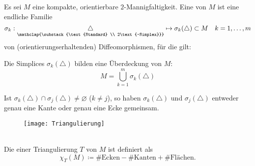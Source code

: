 \begin{definition}
  Es sei \( M \) eine kompakte, orientierbare \( 2 \)-Mannigfaltigkeit. Eine \label{def:triangulierung} von \( M \) ist eine endliche Familie
  \begin{equation*}
    \sigma_k : \underset{\mathclap{\substack{\text{Standard} \\ 2\text{-Simplex}}}}{\triangle} \mapsto \sigma_k(\triangle) \subset M \quad k = 1,\dots,m
  \end{equation*}
  von (orientierungserhaltenden) Diffeomorphismen, für die gilt:
  \begin{enumerate}
    \item Die Simplices \( \sigma_k(\triangle) \) bilden eine Überdeckung von \( M \):
    \begin{equation*}
      M = \bigcup_{k = 1}^m \sigma_k(\triangle)
    \end{equation*}

    \begin{minipage}{.45\textwidth}
      \item Ist \( \sigma_k(\triangle) \cap \sigma_j(\triangle) \neq \varnothing \) (\( k \neq j \)), so haben \( \sigma_k(\triangle) \) und \( \sigma_j(\triangle) \) entweder genau eine Kante oder genau eine Ecke gemeinsam.
    \end{minipage}
    \hfill
    \begin{minipage}{.525\textwidth}
      \begin{figure}[H]
        \texttt{[image: Triangulierung]}
      \end{figure}
    \end{minipage}
  \end{enumerate}
  \  \\

  Die  einer Triangulierung \( T \) von \( M \) ist definiert als
  \begin{equation*}
    \chi_T(M) \coloneqq \#\text{Ecken} - \#\text{Kanten} + \#\text{Flächen.}
  \end{equation*}
\end{definition}

